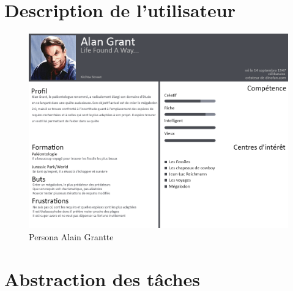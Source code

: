 \documentclass{article}
\begin{document}
\clearpage
\section{Description de l’utilisateur}

\begin{figure}[!h]
	\centering
	\includegraphics[width=16.4cm]{assets/personna/alain_grantte.png}
	\caption{\label{assets/persona/alain_grantte} Persona Alain Grantte}
\end{figure}

\newpage
\section{Abstraction des tâches}
\end{document}
